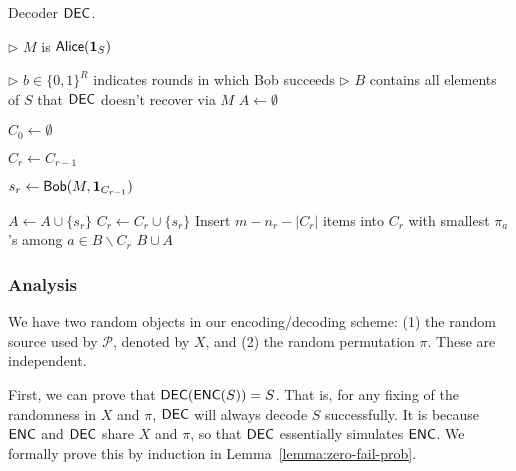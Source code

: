 \begin{algorithm}[H] 
  \caption{Decoder $\textsf{DEC}$.} \label{algo:dec}
  \begin{algorithmic}[1]
    \begin{flushright} $\triangleright$ $M$ is $\mathsf{Alice}(\mathbf{1}_S)$ \end{flushright}
     $\triangleright$ $b\in\{0,1\}^R$ indicates rounds in which Bob succeeds
    \newline $\triangleright$ $B$ contains all elements of $S$ that $\textsf{DEC}$ doesn't recover via $M$
    \State $A\leftarrow \emptyset$ \begin{flushright} \end{flushright}
    \State $C_0 \leftarrow \emptyset$ 
     \begin{flushright} \end{flushright}
      \State $C_r\leftarrow C_{r-1}$
       \begin{flushright} \end{flushright}
        \State $s_r\leftarrow \mathsf{Bob}(M, \mathbf{1}_{C_{r-1}})$ \begin{flushright} \end{flushright}
        \State $A\leftarrow A \cup \{s_r\}$
        \State $C_r\leftarrow C_r \cup \{s_r\}$
      \EndIf
      \State Insert $m-n_r-|C_r|$ items into $C_r$ with smallest $\pi_a$'s among $a\in B\backslash C_r$
      \Statex {} 
    \EndFor
    \State \Return $B\cup A$ 
    \EndProcedure
  \end{algorithmic}
\end{algorithm}
\subsubsection{Analysis}



We have two random objects in our encoding/decoding scheme: (1) the random source used by $\mathcal{P}$, denoted by $X$, and (2) the random permutation $\pi$. These are independent.

First, we can prove that $\textsf{DEC}(\textsf{ENC}(S))=S$.  That is, for any fixing of the randomness in $X$ and $\pi$, $\textsf{DEC}$ will always decode $S$ successfully.  It is because $\textsf{ENC}$ and $\textsf{DEC}$ share $X$ and $\pi$, so that $\textsf{DEC}$ essentially simulates $\textsf{ENC}$.  We formally prove this by induction in Lemma~\ref{lemma:zero-fail-prob}.

